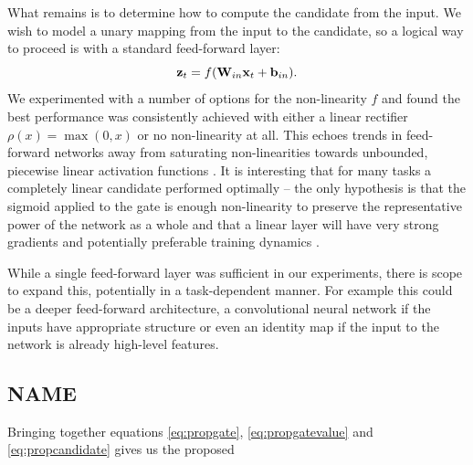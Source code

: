 What remains is to determine how to compute the candidate from the input. We wish to model a unary
mapping from the input to the candidate, so a logical way to proceed is with a standard feed-forward
layer:
\begin{equation}\label{eq:propcandidate}
	\mathbf{z}_t = f(\mathbf{W}_{in}\mathbf{x}_t + \mathbf{b}_{in}).
\end{equation} We experimented with a number of options for the non-linearity \(f\) and found the best
performance was consistently achieved with either a linear rectifier \(\rho(x) = \max(0, x)\) or no
non-linearity at all. This echoes trends in feed-forward networks away from saturating non-linearities
towards unbounded, piecewise linear activation functions \autocite{Goodfellow2013, He}. It is
interesting that for many tasks a completely linear candidate performed optimally -- the only hypothesis
is that the sigmoid applied to the gate is enough non-linearity to preserve the representative power of
the network as a whole and that a linear layer will have very strong gradients and potentially
preferable training dynamics \autocite{Saxe2013}.

While a single feed-forward layer was sufficient in our experiments, there is scope to expand this,
potentially in a task-dependent manner. For example this could be a deeper feed-forward architecture,
a convolutional neural network if the inputs have appropriate structure or even an identity map if the
input to the network is already high-level features.

\subsection{NAME}
Bringing together equations \eqref{eq:propgate}, \eqref{eq:propgatevalue} and \eqref{eq:propcandidate}
gives us the proposed 
